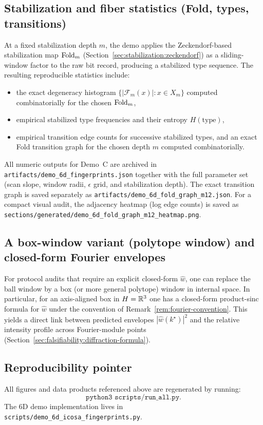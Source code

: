 \subsection{Stabilization and fiber statistics (Fold, types, transitions)}
At a fixed stabilization depth $m$, the demo applies the Zeckendorf-based stabilization map $\mathrm{Fold}_m$ (Section~\ref{sec:stabilization:zeckendorf}) as a sliding-window factor to the raw bit record, producing a stabilized type sequence. The resulting reproducible statistics include:
\begin{itemize}[leftmargin=*,itemsep=2pt]
  \item the exact degeneracy histogram $\{|\mathcal{F}_m(x)|:x\in X_m\}$ computed combinatorially for the chosen $\mathrm{Fold}_m$,
  \item empirical stabilized type frequencies and their entropy $H(\text{type})$,
  \item empirical transition edge counts for successive stabilized types, and an exact Fold transition graph for the chosen depth $m$ computed combinatorially.
\end{itemize}
All numeric outputs for Demo~C are archived in \texttt{artifacts/demo\_6d\_fingerprints.json} together with the full parameter set (scan slope, window radii, $\epsilon$ grid, and stabilization depth). The exact transition graph is saved separately as \texttt{artifacts/demo\_6d\_fold\_graph\_m12.json}.
For a compact visual audit, the adjacency heatmap (log edge counts) is saved as \texttt{sections/generated/demo\_6d\_fold\_graph\_m12\_heatmap.png}.

\subsection{A box-window variant (polytope window) and closed-form Fourier envelopes}
For protocol audits that require an explicit closed-form $\widehat w$, one can replace the ball window by a box (or more general polytope) window in internal space. In particular, for an axis-aligned box in $H=\mathbb{R}^3$ one has a closed-form product-sinc formula for $\widehat w$ under the convention of Remark~\ref{rem:fourier-convention}. This yields a direct link between predicted envelopes $|\widehat w(k^\star)|^2$ and the relative intensity profile across Fourier-module points (Section~\ref{sec:falsifiability:diffraction-formula}).

\subsection{Reproducibility pointer}
All figures and data products referenced above are regenerated by running:
\[
\texttt{python3 scripts/run\_all.py}.
\]
The 6D demo implementation lives in \texttt{scripts/demo\_6d\_icosa\_fingerprints.py}.
